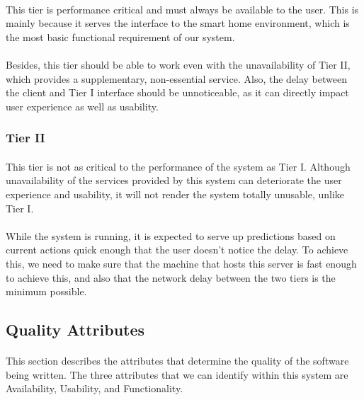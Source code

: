 \paragraph{}
This tier is performance critical and must always be available to the user. This is mainly because it serves the interface to the smart home environment, which is the most basic functional requirement of our system.
\paragraph{}
Besides, this tier should be able to work even with the unavailability of Tier II, which provides a supplementary, non-essential service. Also, the delay between the client and Tier I interface should be unnoticeable, as it can directly impact user experience as well as usability.

\subsubsection*{Tier II}
\paragraph{}
This tier is not as critical to the performance of the system as Tier I. Although unavailability of the services provided by this system can deteriorate the user experience and usability, it will not render the system totally unusable, unlike Tier I.
\paragraph{}
While the system is running, it is expected to serve up predictions based on current actions quick enough that the user doesn't notice the delay. To achieve this, we need to make sure that the machine that hosts this server is fast enough to achieve this, and also that the network delay between the two tiers is the minimum possible.

\pagebreak
\subsection{Quality Attributes}
\paragraph{}
This section describes the attributes that determine the quality of the software being written. The three attributes that we can identify within this system are Availability, Usability, and Functionality.
